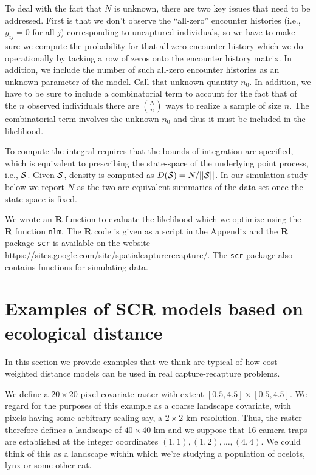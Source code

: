 \documentclass[12pt]{article}
\begin{document}
To deal with the fact that $N$ is unknown,
there are two key issues that need to be addressed.
First is that
we don't observe the ``all-zero'' encounter histories (i.e., $y_{ij} = 0$ for all $j$)
corresponding to 
uncaptured individuals, so we have to
make sure we compute the probability for that all zero encounter history which
we do operationally by tacking a row of zeros onto the encounter history matrix. In
addition, we include the number of such all-zero encounter histories
as an unknown parameter of the model. Call that unknown quantity $n_{0}$.
In addition, we have to be sure to include a combinatorial term to
account for the fact that of the $n$ observed individuals there are
${N \choose n}$
 ways to realize a sample of size $n$. The combinatorial term
involves the unknown $n_{0}$ and thus it must be included in the likelihood.

To compute the integral requires that the bounds of integration are
specified, which is equivalent to prescribing the state-space of the
underlying point process, i.e., ${\cal S}$. Given ${\cal S}$, density
is 
computed as $D({\cal S}) = N/||{\cal S}||$. In our simulation study
below we report $N$ as the two are equivalent summaries of the data
set once the state-space is fixed.

We wrote an {\bf R} function to evaluate the likelihood which we optimize
using the {\bf R} function \mbox{\tt nlm}.
The {\bf R} code is given as a script in the Appendix and the {\bf R}
package \mbox{\tt scr}
is available on the website
\url{https://sites.google.com/site/spatialcapturerecapture/}. The
\mbox{\tt scr} package also contains
functions for simulating data.


\section{Examples of SCR models based on ecological distance}

In this section we provide examples that we think are typical of
how cost-weighted distance models can be used in real
capture-recapture problems.

We define a $20 \times 20$ pixel covariate raster with extent $[0.5, 4.5] \times
[0.5, 4.5]$.  We regard for the purposes of this example as a coarse
landscape covariate, with pixels having some arbitrary scaling say, a
$2 \times 2$ km resolution. Thus, the raster therefore defines a
landscape of $40 \times 40$ km and we suppose that 16 camera traps are
established at the integer coordinates $(1,1), (1,2), \ldots,
(4,4)$. We could think of this as a landscape within which we're
studying a population of ocelots, lynx or some other cat.
\end{document}
